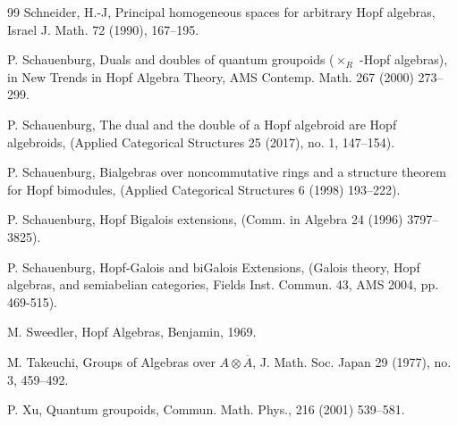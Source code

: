 \documentclass[a4paper,reqno]{amsart}
\numberwithin{equation}{section}
\theoremstyle{plain}
\theoremstyle{remark}
\numberwithin{equation}{section}
\begin{document}
\begin{thebibliography}{99}
Schneider, H.-J,
{Principal homogeneous spaces for arbitrary Hopf algebras}, Israel J. Math. 72
(1990), 167--195.




P. Schauenburg,
{Duals and doubles of quantum groupoids ($\times_R$ -Hopf algebras)}, in New
Trends in Hopf Algebra Theory, AMS Contemp.
Math. 267 (2000) 273--299.



P. Schauenburg,
{The dual and the double of a Hopf algebroid are Hopf algebroids}, (Applied Categorical Structures 25 (2017), no. 1, 147--154).

P. Schauenburg,
{Bialgebras over noncommutative rings and a structure theorem for Hopf bimodules}, (Applied Categorical Structures 6 (1998) 193--222).

P. Schauenburg,
{Hopf Bigalois extensions},  (Comm. in Algebra 24 (1996) 3797--3825).


P. Schauenburg,
{Hopf-Galois and biGalois Extensions},  (Galois theory, Hopf algebras, and semiabelian categories, Fields Inst. Commun. 43, AMS 2004, pp. 469-515).


M. Sweedler, {Hopf Algebras}, Benjamin, 1969.


M. Takeuchi,
{Groups of Algebras over \(A\otimes \overline{A}\)},
J. Math. Soc. Japan 29 (1977), no. 3, 459--492.



P. Xu,
Quantum groupoids,  Commun. Math. Phys., 216 (2001) 539--581.

\end{thebibliography}
\end{document}
